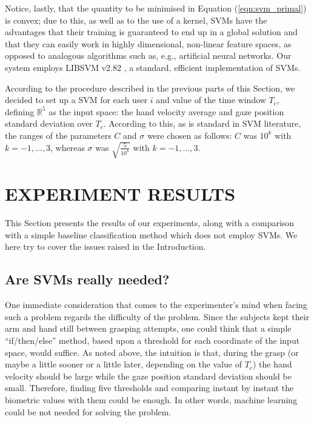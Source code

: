 \documentclass[a4paper,10pt,conference]{ieeeconf}
\def\RR{\mathbb{R}}
\begin{document}
Notice, lastly, that the quantity to be minimised in Equation
(\ref{eqn:svm_primal}) is convex; due to this, as well as to the use
of a kernel, SVMs have the advantages that their training is
guaranteed to end up in a global solution and that they can easily
work in highly dimensional, non-linear feature spaces, as opposed to
analogous algorithms such as, e.g., artificial neural networks. Our
system employs LIBSVM v2.82 \cite{ChangL01}, a standard, efficient
implementation of SVMs.

According to the procedure described in the previous parts of this
Section, we decided to set up a SVM for each user $i$ and value of the
time window $T_c$, defining $\RR^{5}$ as the input space: the hand
velocity average and gaze position standard deviation over
$T_c$. According to this, as is standard in SVM literature, the ranges
of the parameters $C$ and $\sigma$ were chosen as follows: $C$ was
$10^k$ with $k=-1,\ldots,3$, whereas $\sigma$ was
$\sqrt{\frac{5}{10^{k}}}$ with $k=-1,\ldots,3$.

\section{EXPERIMENT RESULTS}
\label{sec:res}

This Section presents the results of our experiments, along with a
comparison with a simple baseline classification method which does not
employ SVMs. We here try to cover the issues raised in the
Introduction.

\subsection{Are SVMs really needed?}

One immediate consideration that comes to the experimenter's mind when
facing such a problem regards the difficulty of the problem. Since the
subjects kept their arm and hand still between grasping attempts, one
could think that a simple ``if/then/else'' method, based upon a
threshold for each coordinate of the input space, would suffice. As
noted above, the intuition is that, during the grasp (or maybe a
little sooner or a little later, depending on the value of $T_c$) the
hand velocity should be large while the gaze position standard
deviation should be small. Therefore, finding five thresholds and
comparing instant by instant the biometric values with them could be
enough. In other words, machine learning could be not needed for
solving the problem.
\end{document}
